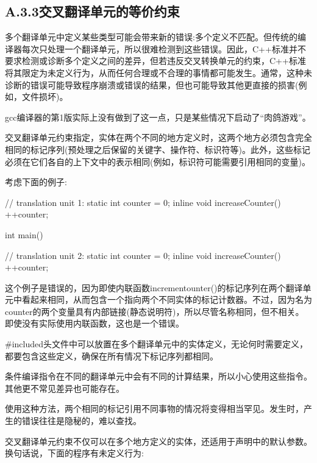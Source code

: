 \subsection{A.3.3\hspace{0.2cm}交叉翻译单元的等价约束}

多个翻译单元中定义某些类型可能会带来新的错误:多个定义不匹配。但传统的编译器每次只处理一个翻译单元，所以很难检测到这些错误。因此，C++标准并不要求检测或诊断多个定义之间的差异，但若违反交叉转换单元的约束，C++标准将其限定为未定义行为，从而任何合理或不合理的事情都可能发生。通常，这种未诊断的错误可能导致程序崩溃或错误的结果，但也可能导致其他更直接的损害(例如，文件损坏)。

\begin{notice}gcc编译器的第1版实际上没有做到了这一点，只是某些情况下启动了“肉鸽游戏”。
\end{notice}

交叉翻译单元约束指定，实体在两个不同的地方定义时，这两个地方必须包含完全相同的标记序列(预处理之后保留的关键字、操作符、标识符等)。此外，这些标记必须在它们各自的上下文中的表示相同(例如，标识符可能需要引用相同的变量)。

考虑下面的例子:

\begin{cpp}
// translation unit 1:
static int counter = 0;
inline void increaseCounter()
{
	++counter;
}

int main()
{ }

// translation unit 2:
static int counter = 0;
inline void increaseCounter()
{
	++counter;
}
\end{cpp}

这个例子是错误的，因为即使内联函数incrementounter()的标记序列在两个翻译单元中看起来相同，从而包含一个指向两个不同实体的标记计数器。不过，因为名为counter的两个变量具有内部链接(静态说明符)，所以尽管名称相同，但不相关。即使没有实际使用内联函数，这也是一个错误。

\#included头文件中可以放置在多个翻译单元中的实体定义，无论何时需要定义，都要包含这些定义，确保在所有情况下标记序列都相同。

\begin{notice}条件编译指令在不同的翻译单元中会有不同的计算结果，所以小心使用这些指令。其他更不常见差异也可能存在。
\end{notice}

使用这种方法，两个相同的标记引用不同事物的情况将变得相当罕见。发生时，产生的错误往往是隐秘的，难以查找。

交叉翻译单元约束不仅可以在多个地方定义的实体，还适用于声明中的默认参数。换句话说，下面的程序有未定义行为:

